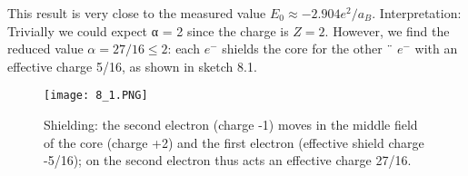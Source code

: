 This result is very close to the measured value $E_0 \approx -2.904 e^2 / a_B$. Interpretation: Trivially we could expect α = 2 since the charge is $Z = 2$. However, we find the reduced value $\alpha = 27/16 \leq 2$: each $e^-$ shields the core for the other ¨ $e^-$ with an effective charge 5/16, as shown in sketch {\color{red}8.1}.
\begin{figure}[ht]
    \begin{minipage}{0.5\textwidth}
        \centering
        \texttt{[image: 8\_1.PNG]}
    \end{minipage}
    \begin{minipage}{0.5\textwidth}
        \caption{Shielding: the second electron (charge -1) moves in the middle field of the core (charge +2) and the first electron (effective shield charge -5/16); on the second electron thus acts an effective charge 27/16.}
    \end{minipage}
\end{figure}